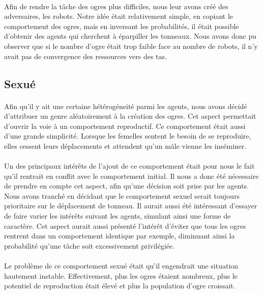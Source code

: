 \paragraph{}
Afin de rendre la tâche des ogres plus difficiles, nous leur avons créé des
adversaires, les robots. Notre idée était relativement simple, en copiant le
comportement des ogres, mais en inversant les probabilités, il était possible
d'obtenir des agents qui cherchent à éparpiller les tonneaux. Nous avons donc
pu observer que si le nombre d'ogre était trop faible face au nombre de robots,
il n'y avait pas de convergence des ressources vers des tas.


\subsection{Sexué}
\paragraph{}
Afin qu'il y ait une certaine hétérogéneité parmi les agents, nous avons décidé
d'attribuer un genre aléatoirement à la création des ogres. Cet aspect
permettait d'ouvrir la voie à un comportement reproductif. Ce comportement était
aussi d'une grande simplicité. Lorsque les femelles sentent le besoin de se
reproduire, elles cessent leurs déplacements et attendent qu'un mâle vienne les
inséminer.

\paragraph{}
Un des principaux intérêts de l'ajout de ce comportement était pour nous le fait
qu'il rentrait en conflit avec le comportement initial. Il nous a donc été
nécessaire de prendre en compte cet aspect, afin qu'une décision soit prise par
les agents. Nous avons tranché en décidant que le comportement sexuel serait
toujours prioritaire sur le déplacement de tonneau. Il aurait aussi été
intéressant d'essayer de faire varier les intérêts suivant les agents, simulant
ainsi une forme de caractère. Cet aspect aurait aussi présenté l'intérêt
d'éviter que tous les ogres rentrent dans un comportement identique par exemple,
diminuant ainsi la probabilité qu'une tâche soit excessivement privilégiée.

\paragraph{}
Le problème de ce comportement sexué était qu'il engendrait une situation
hautement instable. Effectivement, plus les ogres étaient nombreux, plus le
potentiel de reproduction était élevé et plus la population d'ogre croissait.

